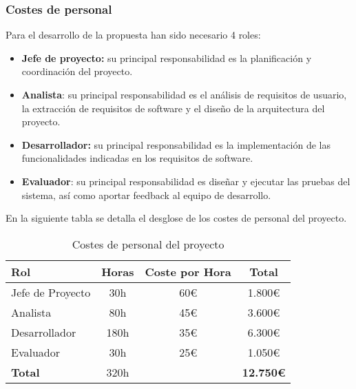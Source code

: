 \subsubsection{Costes de personal}
Para el desarrollo de la propuesta han sido necesario 4 roles: 
\begin{itemize}
    \item \textbf{Jefe de proyecto:} su principal responsabilidad es la planificación y coordinación del proyecto.
    \item \textbf{Analista}: su principal responsabilidad es el análisis de requisitos de usuario, la extracción de requisitos de software y el diseño de la arquitectura del proyecto.
    \item \textbf{Desarrollador:} su principal responsabilidad es la implementación de las funcionalidades indicadas en los requisitos de software.
    \item \textbf{Evaluador}: su principal responsabilidad es diseñar y ejecutar las pruebas del sistema, así como aportar feedback al equipo de desarrollo.
\end{itemize}

En la siguiente tabla se detalla el desglose de los costes de personal del proyecto.


\begin{table}[htbp]
    \centering
    \caption{Costes de personal del proyecto}
    \label{tab:costes_personal}
    \begin{tabular}{@{}lccc@{}}
    \toprule
    \textbf{Rol}     & \textbf{Horas} & \textbf{Coste por Hora} & \textbf{Total}   \\ \midrule
    Jefe de Proyecto & 30h            & 60\euro                 & 1.800\euro       \\
    Analista         & 80h            & 45\euro                 & 3.600\euro       \\
    Desarrollador    & 180h           & 35\euro                 & 6.300\euro       \\
    Evaluador        & 30h            & 25\euro                 & 1.050\euro         \\ \midrule
    \textbf{Total}   & 320h           &                         & \textbf{12.750\euro} \\ \bottomrule
    \end{tabular}
\end{table}

